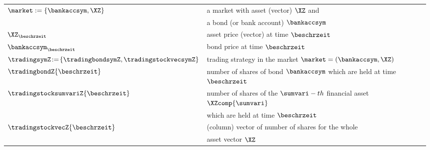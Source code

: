 \begin{longtable}{ll}


\hspace{-0.33cm} $\market := \{\bankaccsym,\XZ\}$ & a market with  asset (vector) $\XZ$ and 
\\
\hspace{-0.33cm} $\ $ & a bond (or bank account) $\bankaccsym$
\\
\hspace{-0.33cm} $\XZ_{\beschrzeit}$ & asset price (vector) at time ${\beschrzeit}$
\\
\hspace{-0.33cm} $\bankaccsym_{\beschrzeit}$ & bond price  at time ${\beschrzeit}$
\\
\hspace{-0.33cm} $\tradingsymZ \negthinspace  := \negthinspace \{ \tradingbondsymZ, \tradingstockvecsymZ
\}$ & trading strategy in the market $\market=(\bankaccsym,\XZ)$
\\
\hspace{-0.33cm} $\tradingbondZ{\beschrzeit}$ & number of shares of bond $\bankaccsym$ which are
held at time $\beschrzeit$ 
\\
\hspace{-0.33cm} $\tradingstocksumvariZ{\beschrzeit}$ & number of shares of
the $\sumvari-th$ financial asset $\XZcomp{\sumvari}$  
\\
\hspace{-0.33cm} $\ $ & which are
held at time $\beschrzeit$
\\
\hspace{-0.33cm} $\tradingstockvecZ{\beschrzeit}$ & (column) vector of number of
shares for the whole
\\ 
\hspace{-0.33cm} $\ $ &  asset vector $\XZ$
\\



\end{longtable}

